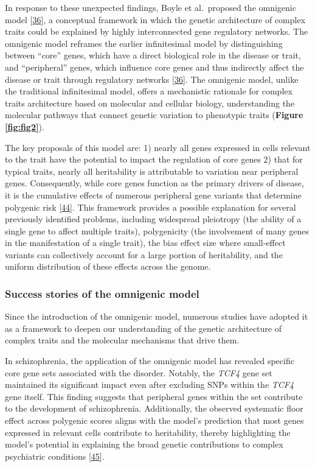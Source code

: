 In response to these unexpected findings, Boyle et al.~proposed the omnigenic model {[}\protect\hyperlink{ref-vpIDZCSa}{36}{]}, a conceptual framework in which the genetic architecture of complex traits could be explained by highly interconnected gene regulatory networks.
The omnigenic model reframes the earlier infinitesimal model by distinguishing between ``core'' genes, which have a direct biological role in the disease or trait, and ``peripheral'' genes, which influence core genes and thus indirectly affect the disease or trait through regulatory networks {[}\protect\hyperlink{ref-vpIDZCSa}{36}{]}.
The omnigenic model, unlike the traditional infinitesimal model, offers a mechanistic rationale for complex traits architecture based on molecular and cellular biology, understanding the molecular pathways that connect genetic variation to phenotypic traits (\textbf{Figure \ref{fig:fig2}}).

The key proposals of this model are: 1) nearly all genes expressed in cells relevant to the trait have the potential to impact the regulation of core genes 2) that for typical traits, nearly all heritability is attributable to variation near peripheral genes.
Consequently, while core genes function as the primary drivers of disease, it is the cumulative effects of numerous peripheral gene variants that determine polygenic risk {[}\protect\hyperlink{ref-LXvTZzEA}{44}{]}.
This framework provides a possible explanation for several previously identified problems, including widespread pleiotropy (the ability of a single gene to affect multiple traits), polygenicity (the involvement of many genes in the manifestation of a single trait), the bias effect size where small-effect variants can collectively account for a large portion of heritability, and the uniform distribution of these effects across the genome.

\hypertarget{success-stories-of-the-omnigenic-model}{%
\subsubsection{Success stories of the omnigenic model}\label{success-stories-of-the-omnigenic-model}}

Since the introduction of the omnigenic model, numerous studies have adopted it as a framework to deepen our understanding of the genetic architecture of complex traits and the molecular mechanisms that drive them.

In schizophrenia, the application of the omnigenic model has revealed specific core gene sets associated with the disorder.
Notably, the \emph{TCF4} gene set maintained its significant impact even after excluding SNPs within the \emph{TCF4} gene itself.
This finding suggests that peripheral genes within the set contribute to the development of schizophrenia.
Additionally, the observed systematic floor effect across polygenic scores aligns with the model's prediction that most genes expressed in relevant cells contribute to heritability, thereby highlighting the model's potential in explaining the broad genetic contributions to complex psychiatric conditions {[}\protect\hyperlink{ref-fV6THoBG}{45}{]}.

